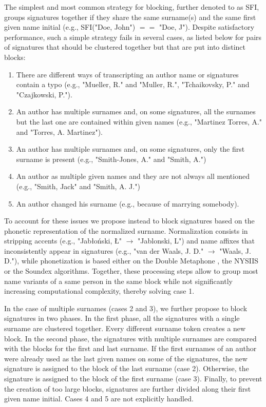 \documentclass{article}
\begin{document}
The simplest and most common strategy for blocking, further denoted to as SFI,
groups signatures together if they share the same surname(s) and the same first
given name initial (e.g., SFI("Doe, John") $==$ "Doe, J"). Despite satisfactory performance, such
a simple strategy fails in several cases, as listed below for
pairs of signatures that should be clustered together but that are put into distinct
blocks:

\begin{enumerate}
  \item There are different
  ways of transcripting an author name or signatures contain a typo
  (e.g., "Mueller, R." and "Muller, R.", "Tchaikovsky, P." and "Czajkowski, P.").

  \item An author has multiple surnames and, on some signatures, all the surnames but the
  last one are contained within given names (e.g., "Martinez Torres, A." and "Torres, A.
  Martinez").

  \item An author has multiple surnames and, on some signatures, only the first surname is
  present (e.g., "Smith-Jones, A." and "Smith, A.")

  \item An author as multiple given names and they are not always all mentioned (e.g.,
  "Smith, Jack" and "Smith, A. J.")

  \item An author changed his surname (e.g., because of marrying somebody).
\end{enumerate}

To account for these issues we propose instead to block signatures based on the
phonetic representation of the normalized surname. Normalization consists in
stripping accents (e.g., "Jabłoński, Ł" $\rightarrow$ "Jablonski, L") and name
affixes that inconsistently appear in signatures (e.g., "van der Waals, J. D."
$\rightarrow$ "Waals, J. D."), while phonetization is based either on the
Double Metaphone \citep{doublemetaphone}, the NYSIIS \citep{nysiis} or the
Soundex \citep{Soundex} algorithms. Together, these processing steps allow to
group most name variants of a same person in the same block while not
significantly increasing computational complexity, thereby solving case 1.

In the case of multiple surnames (cases 2 and 3), we further propose to block
signatures in two phases. In the first phase, all the signatures with a single
surname are clustered together. Every different surname token creates a new
block. In the second phase, the signatures  with multiple surnames are compared
with the blocks for the first and last surname.  If the first surnames of an
author were already used as the last given names on some of the signatures, the
new signature is assigned to the block of the last surname (case 2). Otherwise,
the signature is assigned to the block of the first surname (case 3). Finally,
to prevent the creation of too large blocks, signatures are further divided
along their first given name initial.  Cases 4 and 5 are not
explicitly handled.
\end{document}
